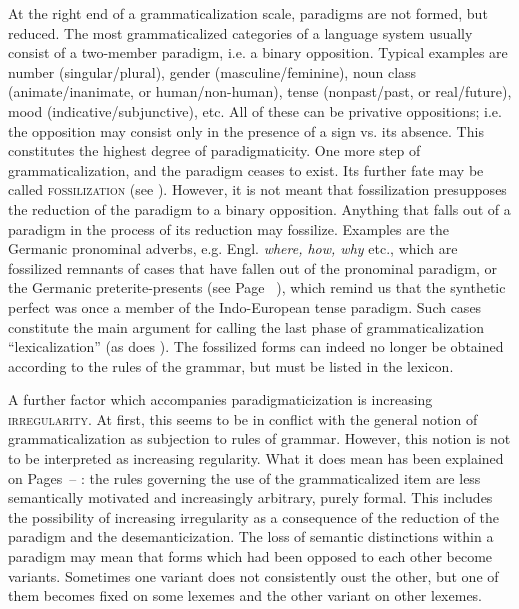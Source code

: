 At the right end of a grammaticalization scale, paradigms are not formed, but reduced. The most grammaticalized categories of a language system usually consist of a two-member paradigm, i.e. a binary opposition. Typical examples are number (singular/plural), gender (masculine/feminine), noun class (animate/inanimate, or human/non-human), tense (nonpast/past, or real/future), mood (indicative/subjunctive), etc. All of these can be privative oppositions; i.e. the opposition may consist only in the presence of a sign vs. its absence. This constitutes the highest degree of paradigmaticity. One more step of grammaticalization, and the paradigm ceases to exist. Its further fate may be called \textsc{fossilization}\label{page147} (see \citealt[35f]{HeineEtAl1984}). However, it is not meant that fossilization presupposes the reduction of the paradigm to a binary opposition. Anything that falls out of a paradigm in the process of its reduction may fossilize. Examples are the Germanic pronominal adverbs, e.g. Engl. \textit{where, how, why} etc., which are fossilized remnants of cases that have fallen out of the pronominal paradigm, or the Germanic preterite-presents (see Page~\pageref{page30}\chk%
), which remind us that the synthetic perfect was once a member of the Indo-European tense paradigm. Such cases constitute the main argument for calling the last phase of grammaticalization ``lexicalization'' (as does \citealt[209]{Givón1979b}). The fossilized forms can indeed no longer be obtained according to the rules of the grammar, but must be listed in the lexicon.

A further factor which accompanies paradigmaticization is increasing \textsc{irregularity}. At first, this seems to be in conflict with the general notion of grammaticalization as subjection to rules of grammar. However, this notion is not to be interpreted as increasing regularity. What it does mean has been explained on Pages~\pageref{page140}--\pageref{page141}\chk%
: the rules governing the use of the grammaticalized item are less semantically motivated and increasingly arbitrary, purely formal. This includes the possibility of increasing irregularity as a consequence of the reduction of the paradigm and the desemanticization. The loss of semantic distinctions within a paradigm may mean that forms which had been opposed to each other become variants. Sometimes one variant does not consistently oust the other, but one of them becomes fixed on some lexemes and the other variant on other lexemes.

